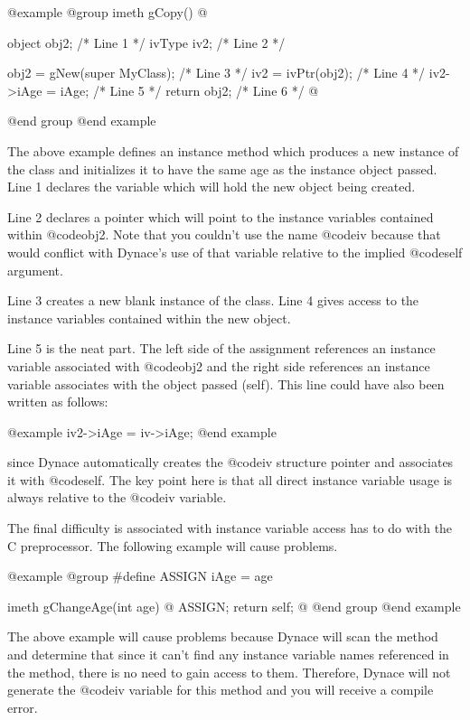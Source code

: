 @example
@group
imeth   gCopy()
@{
        object  obj2;                   /*  Line 1  */
        ivType  iv2;                    /*  Line 2  */

        obj2 = gNew(super MyClass);     /*  Line 3  */
        iv2  = ivPtr(obj2);             /*  Line 4  */
        iv2->iAge = iAge;               /*  Line 5  */
        return obj2;                    /*  Line 6  */
@}
@end group
@end example

The above example defines an instance method which produces a new
instance of the class and initializes it to have the same age as
the instance object passed.  Line 1 declares the variable which will hold
the new object being created.

Line 2 declares a pointer which will point to the instance variables contained
within @code{obj2}.  Note that you couldn't use the name @code{iv} because
that would conflict with Dynace's use of that variable relative to the
implied @code{self} argument.

Line 3 creates a new blank instance of the class.  Line 4 gives access
to the instance variables contained within the new object.

Line 5 is the neat part.  The left side of the assignment references
an instance variable associated with @code{obj2} and the right side
references an instance variable associates with the object passed
(self).  This line could have also been written as follows:

@example
        iv2->iAge = iv->iAge;
@end example

since Dynace automatically creates the @code{iv} structure pointer and
associates it with @code{self}.  The key point here is that
all direct instance variable usage is always relative to the @code{iv}
variable.

The final difficulty is associated with instance variable access has to do
with the C preprocessor.  The following example will cause problems.

@example
@group
#define ASSIGN  iAge = age

imeth   gChangeAge(int age)
@{
        ASSIGN;
        return self;
@}
@end group
@end example

The above example will cause problems because Dynace will scan the
method and determine that since it can't find any instance variable
names referenced in the method, there is no need to gain access to them.
Therefore, Dynace will not generate the @code{iv} variable for this
method and you will receive a compile error.

